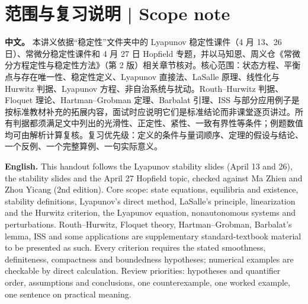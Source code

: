 \documentclass[UTF8,11pt,a4paper]{ctexart}
\newcommand{\APS}[2]{\par\noindent\textbf{中文。} #1\par\noindent\textbf{English.} #2\par}
\begin{document}
\section*{范围与复习说明 | Scope note}
\APS{本讲义依据“稳定性”文件夹中的 Lyapunov 稳定性课件（4 月 13、26 日）、常微分稳定性课件和 4 月 27 日 Hopfield 专题，并以马知恩、周义仓《常微分方程定性与稳定性方法》（第 2 版）相关章节核对。核心范围：状态方程、平衡点与存在唯一性、稳定性定义、Lyapunov 直接法、LaSalle 原理、线性化与 Hurwitz 判据、Lyapunov 方程、非自治系统与扰动。Routh--Hurwitz 判据、Floquet 理论、Hartman--Grobman 定理、Barbalat 引理、ISS 与部分应用例子是按标准教材补充的拓展内容，面试时应说明它们是标准结论而非课堂逐页讲过。所有判据都须满足文中列出的光滑性、正定性、紧性、一致有界性等条件；例题数值均可由解析计算复核。复习优先级：定义的条件与量词顺序、定理的假设与结论、一个反例、一个完整算例、一句实际意义。}{This handout follows the Lyapunov stability slides (April 13 and 26), the stability slides and the April 27 Hopfield topic, checked against Ma Zhien and Zhou Yicang (2nd edition). Core scope: state equations, equilibria and existence, stability definitions, Lyapunov's direct method, LaSalle's principle, linearization and the Hurwitz criterion, the Lyapunov equation, nonautonomous systems and perturbations. Routh--Hurwitz, Floquet theory, Hartman--Grobman, Barbalat's lemma, ISS and some applications are supplementary standard-textbook material to be presented as such. Every criterion requires the stated smoothness, definiteness, compactness and boundedness hypotheses; numerical examples are checkable by direct calculation. Review priorities: hypotheses and quantifier order, assumptions and conclusions, one counterexample, one worked example, one sentence on practical meaning.}
\end{document}
